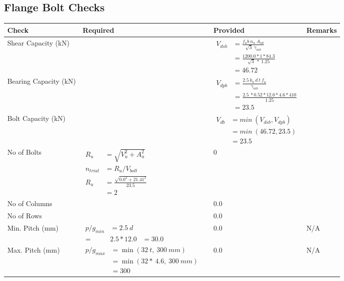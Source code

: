 \documentclass{article}%
\begin{document}
\subsection{Flange Bolt Checks}%
\label{subsec:FlangeBoltChecks}%
\renewcommand{\arraystretch}{1.2}%
\begin{longtable}{|p{4cm}|p{5cm}|p{5.5cm}|p{1.5cm}|}%
\hline%
\rowcolor{OsdagGreen}%
Check&Required&Provided&Remarks\\%
\hline%
\endhead%
\hline%
Shear Capacity (kN)&&$\begin{aligned}V_{dsb} &= \frac{f_ub ~n_n~ A_{nb}}{\sqrt{3} ~\gamma_{mb}}\\ &= \frac{1200.0*1*84.3}{\sqrt{3}~*~1.25}\\ &= 46.72\end{aligned}$&\\%
\hline%
Bearing Capacity (kN)&&$\begin{aligned}V_{dpb} &= \frac{2.5~ k_b~ d~ t~ f_u}{\gamma_{mb}}\\ &= \frac{2.5~*0.52*12.0*4.6*410}{1.25}\\ &=23.5\end{aligned}$&\\%
\hline%
Bolt Capacity (kN)&&$\begin{aligned}V_{db} &= min~ (V_{dsb}, V_{dpb})\\ &= min~ (46.72,23.5)\\ &=23.5\end{aligned}$&\\%
\hline%
No of Bolts&$\begin{aligned}R_{u} &= \sqrt{V_u^2+A_u^2}\\ n_{trial} &= R_u/ V_{bolt}\\ R_{u} &= \frac{\sqrt{0.0^2+21.41^2}}{23.5}\\ &=2\end{aligned}$&0&\\%
\hline%
No of Columns&&0.0&\\%
\hline%
No of Rows&&0.0&\\%
\hline%
Min. Pitch (mm)&$\begin{aligned}p/g_{min}&= 2.5 ~ d&\\ =&2.5*12.0&=30.0\end{aligned}$&0.0&N/A\\%
\hline%
Max. Pitch (mm)&$\begin{aligned}p/g_{max} &=\min(32~t,~300~mm)&\\ &=\min(32 *~4.6,~ 300 ~mm)\\&=300\end{aligned}$&0.0&N/A\\%

\end{longtable}
\end{document}
